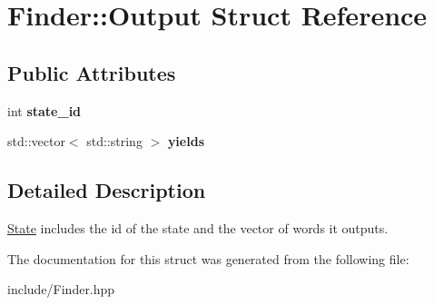 \hypertarget{structFinder_1_1Output}{}\section{Finder\+:\+:Output Struct Reference}
\label{structFinder_1_1Output}
\subsection*{Public Attributes}
\begin{DoxyCompactItemize}
\item 
\mbox{\label{structFinder_1_1Output_a9034d2ab10ec03c6b018ba0e8a3dc251}} 
int {\bfseries state\+\_\+id}
\item 
\mbox{\label{structFinder_1_1Output_ab8e0a1bf082c765f0bfe154433a19b67}} 
std\+::vector$<$ std\+::string $>$ {\bfseries yields}
\end{DoxyCompactItemize}


\subsection{Detailed Description}
\hyperlink{structFinder_1_1State}{State} includes the id of the state and the vector of words it outputs. 

The documentation for this struct was generated from the following file\+:\begin{DoxyCompactItemize}
\item 
include/Finder.\+hpp\end{DoxyCompactItemize}
